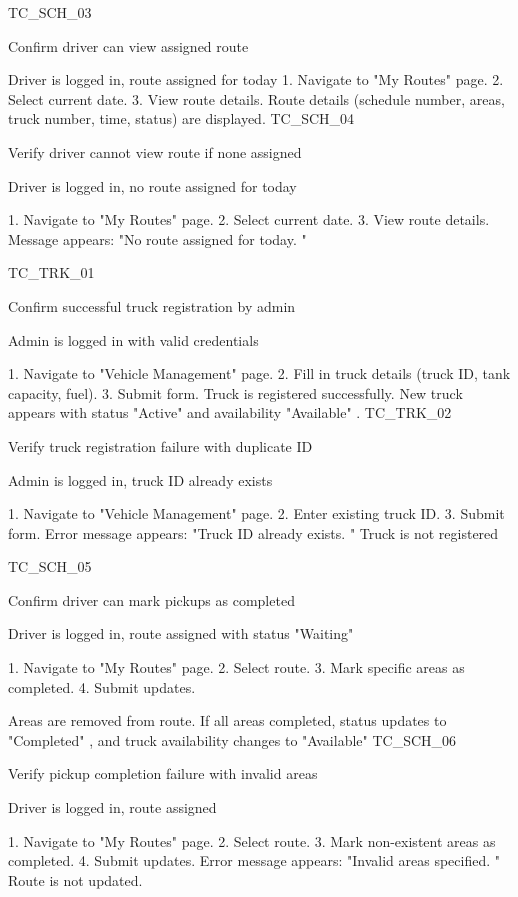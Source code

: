 \documentclass{article}
\begin{document}
TC\_SCH\_03 
 
Confirm 
driver can 
view 
assigned 
route 
 
Driver is logged 
in, route 
assigned for 
today 
1. Navigate to "My 
Routes" page. 2. 
Select current date. 
3. View route details. 
Route details 
(schedule number, 
areas, truck 
number, time, 
status) are 
displayed. 
TC\_SCH\_04 
 
Verify driver 
cannot view 
route if none 
assigned 
 
Driver is logged 
in, no route 
assigned for 
today 
 
1. Navigate to "My 
Routes" page. 2. 
Select current date. 
3. View route details. 
Message appears: 
"No route assigned 
for today. " 
 
TC\_TRK\_01 
 
Confirm 
successful 
truck 
registration 
by admin 
 
Admin is 
logged in with 
valid 
credentials 
 
1. Navigate to 
"Vehicle 
Management" page. 
2. Fill in truck details 
(truck ID, tank 
capacity, fuel). 3. 
Submit form. 
Truck is registered 
successfully. New 
truck appears with 
status "Active" and 
availability 
"Available" . 
TC\_TRK\_02 
 
Verify truck 
registration 
failure with 
duplicate ID 
 
Admin is 
logged in, truck 
ID already 
exists 
 
1. Navigate to 
"Vehicle 
Management" page. 
2. Enter existing 
truck ID. 3. Submit 
form. 
Error message 
appears: "Truck ID 
already exists. " 
Truck is not 
registered 
 
TC\_SCH\_05 
 
Confirm 
driver can 
mark 
pickups as 
completed 
 
Driver is logged 
in, route 
assigned with 
status 
"Waiting" 
 
1. Navigate to "My 
Routes" page. 2. 
Select route. 3. Mark 
specific areas as 
completed. 4. 
Submit updates. 
 
Areas are removed 
from route. If all 
areas completed, 
status updates to 
"Completed" , and 
truck availability 
changes to 
"Available" 
TC\_SCH\_06 
 
Verify 
pickup 
completion 
failure with 
invalid areas 
 
Driver is logged 
in, route 
assigned 
 
1. Navigate to "My 
Routes" page. 2. 
Select route. 3. Mark 
non-existent areas 
as completed. 4. 
Submit updates. 
Error message 
appears: "Invalid 
areas specified. " 
Route is not 
updated. 
 
\end{document}
